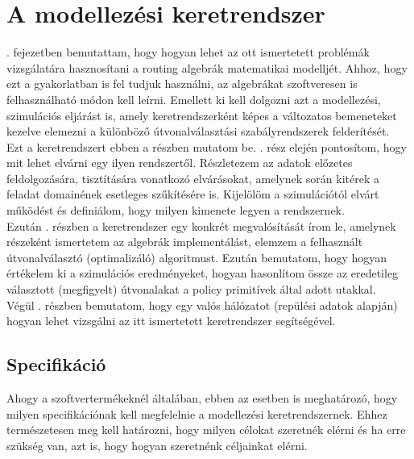 \chapter{A modellezési keretrendszer}\label{framework}
. fejezetben bemutattam, hogy hogyan lehet az ott ismertetett problémák vizsgálatára hasznosítani a routing algebrák matematikai modelljét. Ahhoz, hogy ezt a gyakorlatban is fel tudjuk használni, az algebrákat szoftveresen is felhasználható módon kell leírni. Emellett ki kell dolgozni azt a modellezési, szimulációs eljárást is, amely keretrendszerként képes a változatos bemeneteket kezelve elemezni a különböző útvonalválasztási szabályrendszerek felderítését.\\

Ezt a keretrendszert ebben a részben mutatom be. . rész elején pontosítom, hogy mit lehet elvárni egy ilyen rendszertől. Részletezem az adatok előzetes feldolgozására, tisztítására vonatkozó elvárásokat, amelynek során kitérek a feladat domainének esetleges szűkítésére is. Kijelölöm a szimulációtól elvárt működést és definiálom, hogy milyen kimenete legyen a rendszernek.\\
Ezután . részben a keretrendszer egy konkrét megvalósítását írom le, amelynek részeként ismertetem az algebrák implementálást, elemzem a felhasznált útvonalválasztó (optimalizáló) algoritmust. Ezután bemutatom, hogy hogyan értékelem ki a szimulációs eredményeket, hogyan hasonlítom össze az eredetileg választott (megfigyelt) útvonalakat a policy primitívek által adott utakkal.\\
Végül . részben bemutatom, hogy egy valós hálózatot (repülési adatok alapján) hogyan lehet vizsgálni az itt ismertetett keretrendszer segítségével.

  \section{Specifikáció}\label{section_specification}
  Ahogy a szoftvertermékeknél általában, ebben az esetben is meghatározó, hogy milyen specifikációnak kell megfelelnie a modellezési keretrendszernek. Ehhez természetesen meg kell határozni, hogy milyen célokat szeretnék elérni és ha erre szükség van, azt is, hogy hogyan szeretnénk céljainkat elérni.\\

